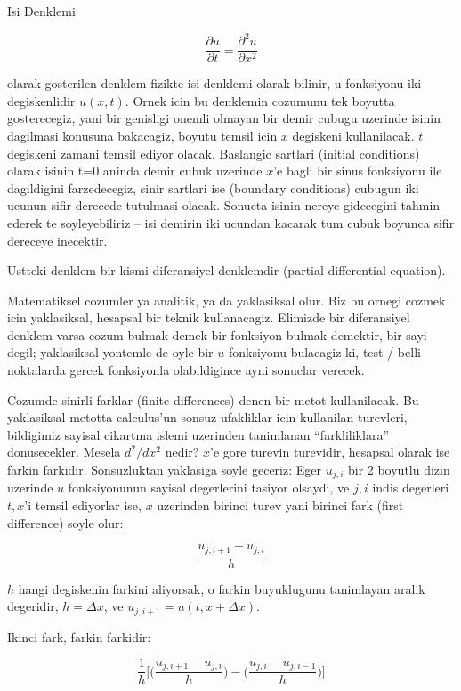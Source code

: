 \documentclass[12pt,fleqn]{article}\usepackage{../common}
\begin{document}
Isi Denklemi

$$ \frac{\partial u}{\partial t} = \frac{\partial^2u}{\partial x^2} $$

olarak gosterilen denklem fizikte isi denklemi olarak bilinir, u
fonksiyonu iki degiskenlidir $u(x,t)$. Ornek icin bu denklemin
cozumunu tek boyutta gosterecegiz, yani bir genisligi onemli olmayan
bir demir cubugu uzerinde isinin dagilmasi konusuna bakacagiz, boyutu
temsil icin $x$ degiskeni kullanilacak. $t$ degiskeni zamani temsil
ediyor olacak. Baslangic sartlari (initial conditions) olarak isinin
t=0 aninda demir cubuk uzerinde $x$'e bagli bir sinus fonksiyonu ile
dagildigini farzedecegiz, sinir sartlari ise (boundary conditions)
cubugun iki ucunun sifir derecede tutulmasi olacak. Sonucta isinin
nereye gidecegini tahmin ederek te soyleyebiliriz -- isi demirin iki
ucundan kacarak tum cubuk boyunca sifir dereceye inecektir.

Ustteki denklem bir kismi diferansiyel denklemdir (partial
differential equation).

Matematiksel cozumler ya analitik, ya da yaklasiksal olur. Biz bu ornegi cozmek
icin yaklasiksal, hesapsal bir teknik kullanacagiz. Elimizde bir diferansiyel
denklem varsa cozum bulmak demek bir fonksiyon bulmak demektir, bir sayi degil;
yaklasiksal yontemle de oyle bir $u$ fonksiyonu bulacagiz ki, test / belli
noktalarda gercek fonksiyonla olabildigince ayni sonuclar verecek.

Cozumde sinirli farklar (finite differences) denen bir metot kullanilacak. Bu
yaklasiksal metotta calculus'un sonsuz ufakliklar icin kullanilan turevleri,
bildigimiz sayisal cikartma islemi uzerinden tanimlanan ``farkliliklara''
donusecekler. Mesela $d^2/dx^2$ nedir? $x$'e gore turevin turevidir, hesapsal
olarak ise farkin farkidir. Sonsuzluktan yaklasiga soyle geceriz: Eger $u_{j,i}$
bir 2 boyutlu dizin uzerinde $u$ fonksiyonunun sayisal degerlerini tasiyor
olsaydi, ve $j, i$ indis degerleri $t, x$'i temsil ediyorlar ise, $x$ uzerinden
birinci turev yani birinci fark (first difference) soyle olur:

$$ \frac{u_{j,i+1}-u_{j,i}}{h} $$

$h$ hangi degiskenin farkini aliyorsak, o farkin buyuklugunu
tanimlayan aralik degeridir, $h=\Delta x$, ve $u_{j,i+1} = u(t,x +
\Delta x)$.

Ikinci fark, farkin farkidir:

$$ \frac{1}{h}
\bigg[
\bigg( \frac{u_{j,i+1}-u_{j,i}}{h} \bigg) -
\bigg( \frac{u_{j,i}-u_{j,i-1}}{h} \bigg)
\bigg] 
 $$
\end{document}
